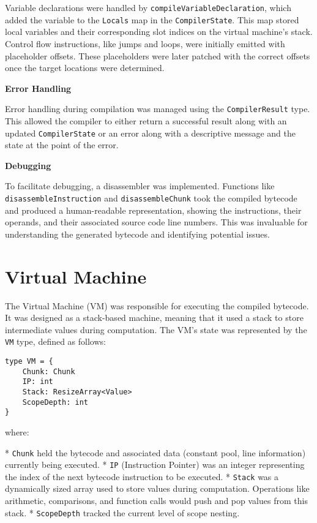 Variable declarations were handled by \texttt{compileVariableDeclaration}, which added the variable to the \texttt{Locals} map in the \texttt{CompilerState}. 
This map stored local variables and their corresponding slot indices on the virtual machine's stack. 
Control flow instructions, like jumps and loops, were initially emitted with placeholder offsets. 
These placeholders were later patched with the correct offsets once the target locations were determined.

\textbf{Error Handling}

Error handling during compilation was managed using the \texttt{CompilerResult} type. 
This allowed the compiler to either return a successful result along with an updated \texttt{CompilerState} or an error along with a descriptive message and the state at the point of the error.

\textbf{Debugging}

To facilitate debugging, a disassembler was implemented. 
Functions like \texttt{disassembleInstruction} and \texttt{disassembleChunk} took the compiled bytecode and produced a human-readable representation, showing the instructions, their operands, and their associated source code line numbers. 
This was invaluable for understanding the generated bytecode and identifying potential issues.

\section{Virtual Machine}\label{sec:virtual-machine2}

The Virtual Machine (VM) was responsible for executing the compiled bytecode. 
It was designed as a stack-based machine, meaning that it used a stack to store intermediate values during computation. 
The VM's state was represented by the \texttt{VM} type, defined as follows:

\begin{verbatim}
type VM = {
    Chunk: Chunk
    IP: int
    Stack: ResizeArray<Value>
    ScopeDepth: int  
}
\end{verbatim}

\noindent where:

*   \texttt{Chunk} held the bytecode and associated data (constant pool, line information) currently being executed.
*   \texttt{IP} (Instruction Pointer) was an integer representing the index of the next bytecode instruction to be executed.
*   \texttt{Stack} was a dynamically sized array used to store values during computation. Operations like arithmetic, comparisons, and function calls would push and pop values from this stack.
*   \texttt{ScopeDepth} tracked the current level of scope nesting.

